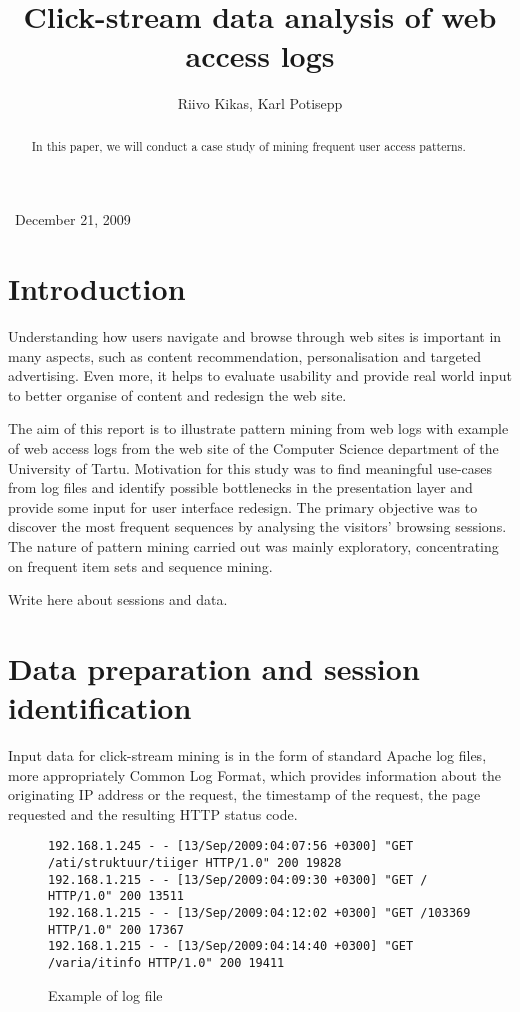 \documentclass{article}
\begin{document}
\ December 21, 2009 \title{Click-stream data analysis of web access
logs}\author{Riivo Kikas, Karl Potisepp\\
}\maketitle

\begin{abstract}
  In this paper, we will conduct a case study of mining frequent user access
  patterns.
\end{abstract}

\section{Introduction} Understanding how users navigate and browse through web
sites is important in many aspects, such as content recommendation,
personalisation and targeted advertising. Even more, it helps to evaluate
usability and provide real world input to better organise of content and
redesign the web site.

The aim of this report is to illustrate pattern mining from web logs with
example of web access logs from the web site of the Computer Science
department of the University of Tartu. Motivation for this study was to find
meaningful use-cases from log files and identify possible bottlenecks in the
presentation layer and provide some input for user interface redesign. The
primary objective was to discover the most frequent sequences by analysing the
visitors' browsing sessions. The nature of pattern mining carried out was
mainly exploratory, concentrating on frequent item sets and sequence mining.

Write here about sessions and data.

\section{Data preparation and session identification} Input data for
click-stream mining is in the form of standard Apache log files, more
appropriately Common Log Format, which provides information about the
originating IP address or the request, the timestamp of the request, the page
requested and the resulting HTTP status code.

\begin{figure}[h]
  
  \begin{verbatim}
192.168.1.245 - - [13/Sep/2009:04:07:56 +0300] "GET /ati/struktuur/tiiger HTTP/1.0" 200 19828
192.168.1.215 - - [13/Sep/2009:04:09:30 +0300] "GET / HTTP/1.0" 200 13511
192.168.1.215 - - [13/Sep/2009:04:12:02 +0300] "GET /103369 HTTP/1.0" 200 17367
192.168.1.215 - - [13/Sep/2009:04:14:40 +0300] "GET /varia/itinfo HTTP/1.0" 200 19411
\end{verbatim}
  
  \caption{Example of log file}
\end{figure}
\end{document}
